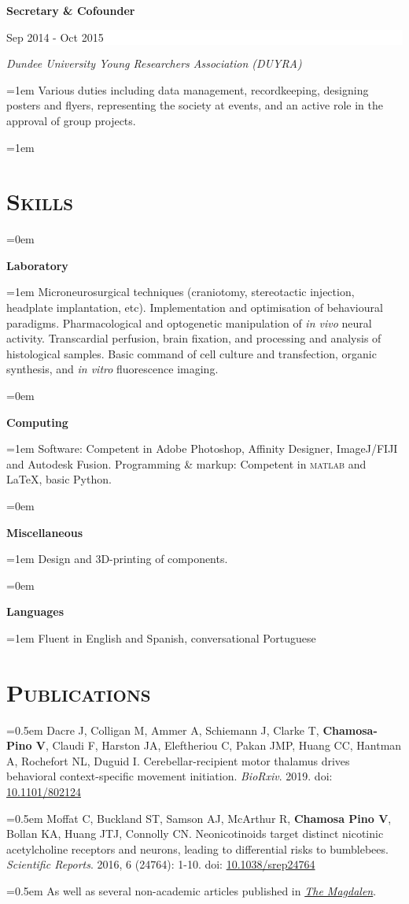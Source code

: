 \documentclass[paper=a4,fontsize=11pt]{scrartcl}
\newlength{\spacebox}
\newcommand{\sepspace}{\vspace*{1em}}
\newcommand{\NewPart}[1]{\section*{\textsc{#1}}} %
\newcommand{\ExperienceEntry}[5]{ %
		\noindent \textbf{#1} \hfill %
		\colorbox{White}{
            \parbox{9em}{
			\hfill\color{Black}#2}} \par %
		\noindent \textit{#3} \par %
		\noindent\hangindent=1em\hangafter=0 \small #4 %
		\normalsize \par
		\hangindent=1em\hangafter=1 \small #5 \par} %
\newcommand{\SkillsEntry}[2]{ %
		\noindent\hangindent=0em\hangafter=0 
		\parbox{\spacebox}{        
		\textbf{#1}} %
		\hspace{2em} \hangindent=1em \hangafter=1 #2 \par} %
\begin{document}
\ExperienceEntry{Secretary \& Cofounder}{Sep 2014 - Oct 2015}{Dundee University Young Researchers Association (DUYRA)}{Various duties including data management, recordkeeping, designing posters and flyers, representing the society at events, and an active role in the approval of group projects.}{}


\NewPart{Skills}{}

\SkillsEntry{Laboratory}{Microneurosurgical techniques (craniotomy, stereotactic injection, headplate implantation, etc). Implementation and optimisation of behavioural paradigms. Pharmacological and optogenetic manipulation of \textit{in vivo} neural activity. Transcardial perfusion, brain fixation, and processing and analysis of histological samples. Basic command of cell culture and transfection, organic synthesis, and \textit{in vitro} fluorescence imaging.}
\sepspace

\SkillsEntry{Computing}{Software: Competent in Adobe Photoshop, Affinity Designer, ImageJ/FIJI and Autodesk Fusion. Programming \& markup: Competent in \textsc{matlab} and \LaTeX, basic Python.}
\sepspace

\SkillsEntry{Miscellaneous}{Design and 3D-printing of components.}
\sepspace

\SkillsEntry{Languages}{Fluent in English and Spanish, conversational Portuguese}


\NewPart{Publications}{}

\noindent\hangindent=0.5em \small Dacre J, Colligan M, Ammer A, Schiemann J, Clarke T, \textbf{Chamosa-Pino V}, Claudi F, Harston JA, Eleftheriou C, Pakan JMP, Huang CC, Hantman A, Rochefort NL, Duguid I. Cerebellar-recipient motor thalamus drives behavioral context-specific movement initiation. \textit{BioRxiv}. 2019. doi: \href{https://www.biorxiv.org/content/10.1101/802124v1}{10.1101/802124} \par
\sepspace

\noindent\hangindent=0.5em \small Moffat C, Buckland ST, Samson AJ, McArthur R, \textbf{Chamosa Pino V}, Bollan KA, Huang JTJ, Connolly CN. Neonicotinoids target distinct nicotinic acetylcholine receptors and neurons, leading to differential risks to bumblebees. \textit{Scientific Reports}. 2016, 6 (24764): 1-10. doi: \href{https://www.nature.com/articles/srep24764}{10.1038/srep24764} \par
\sepspace

\noindent\hangindent=0.5em \small As well as several non-academic articles published in \href{https://issuu.com/themagdalen}{\textit{The Magdalen}}.
\end{document}
